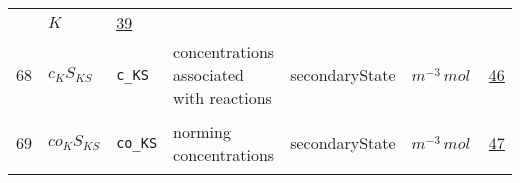 \begin{longtable}{|p{1cm}|p{2.5cm}|p{4.5cm}|p{8cm}|p{3.0cm}|p{3cm}|p{1cm}|}
             & $ K \, $
             & \hyperlink{"e:39"}{ 39 }
                 \\
    68
             & \hypertarget{"v:68"}{ $ {c_KS}{_{{K S}}} $}
             & \verb|c_KS|
             & concentrations associated with reactions
             & \begin{lay}secondaryState \end{lay}
             & $ m^{-3} \,mol \, $
             & \hyperlink{"e:46"}{ 46 }
                 \\
    69
             & \hypertarget{"v:69"}{ $ {co_KS}{_{{K S}}} $}
             & \verb|co_KS|
             & norming concentrations
             & \begin{lay}secondaryState \end{lay}
             & $ m^{-3} \,mol \, $
             & \hyperlink{"e:47"}{ 47 }
                 \\
    \end{longtable}